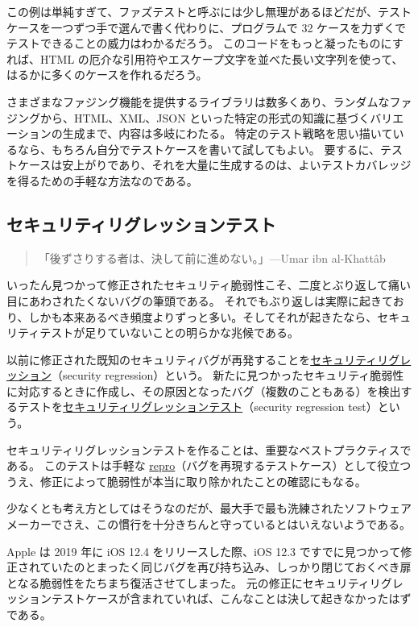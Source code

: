 \documentclass[uplatex]{jsarticle}
\def\label#1{}%
\begin{document}
この例は単純すぎて、ファズテストと呼ぶには少し無理があるほどだが、テストケースを一つずつ手で選んで書く代わりに、プログラムで 32 ケースを力ずくでテストできることの威力はわかるだろう。
このコードをもっと凝ったものにすれば、HTML の厄介な引用符やエスケープ文字を並べた長い文字列を使って、はるかに多くのケースを作れるだろう。

さまざまなファジング機能を提供するライブラリは数多くあり、ランダムなファジングから、HTML、XML、JSON といった特定の形式の知識に基づくバリエーションの生成まで、内容は多岐にわたる。
特定のテスト戦略を思い描いているなら、もちろん自分でテストケースを書いて試してもよい。
要するに、テストケースは安上がりであり、それを大量に生成するのは、よいテストカバレッジを得るための手軽な方法なのである。

\subsection{セキュリティリグレッションテスト}

\begin{quote}
「後ずさりする者は、決して前に進めない。」\hfill ---Umar ibn al-Khattâb
\end{quote}

いったん見つかって修正されたセキュリティ脆弱性こそ、二度とぶり返して痛い目にあわされたくないバグの筆頭である。
それでもぶり返しは実際に起きており、しかも本来あるべき頻度よりずっと多い。そしてそれが起きたなら、セキュリティテストが足りていないことの明らかな兆候である。

\begin{dfn}[セキュリティリグレッションテスト]\label{dfn:ch12-security-regression-test}
以前に修正された既知のセキュリティバグが再発することを\underline{セキュリティリグレッション}（security regression）という。
新たに見つかったセキュリティ脆弱性に対応するときに作成し、その原因となったバグ（複数のこともある）を検出するテストを\underline{セキュリティリグレッションテスト}（security regression test）という。
\end{dfn}

セキュリティリグレッションテストを作ることは、重要なベストプラクティスである。
このテストは手軽な \underline{repro}（バグを再現するテストケース）として役立つうえ、修正によって脆弱性が本当に取り除かれたことの確認にもなる。

少なくとも考え方としてはそうなのだが、最大手で最も洗練されたソフトウェアメーカーでさえ、この慣行を十分きちんと守っているとはいえないようである。

\begin{exa}\label{exa:ch12-ios-regression}
Apple は 2019 年に iOS 12.4 をリリースした際、iOS 12.3 ですでに見つかって修正されていたのとまったく同じバグを再び持ち込み、しっかり閉じておくべき扉となる脆弱性をたちまち復活させてしまった。
元の修正にセキュリティリグレッションテストケースが含まれていれば、こんなことは決して起きなかったはずである。
\end{exa}
\end{document}
